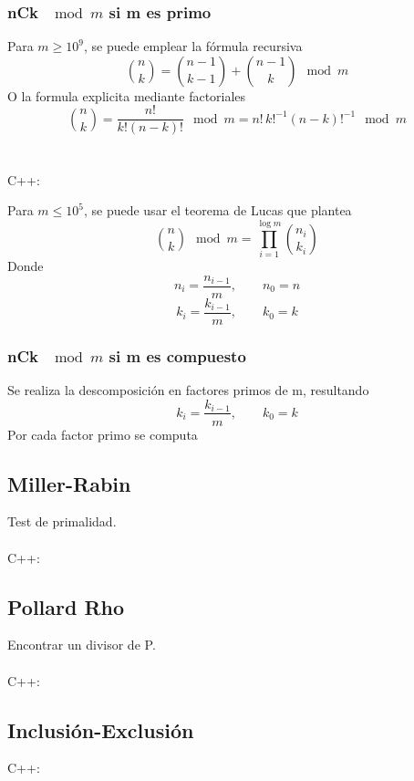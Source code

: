\documentclass{article}
\begin{document}
        \subsubsection{nCk $\mod{m}$ si m es primo}
            Para $m \geq 10^9$, se puede emplear la fórmula recursiva
            \[
                \binom{n}{k} = \binom{n - 1}{k - 1} + \binom{n - 1}{k} \mod{m}
            \]
            O la formula explicita mediante factoriales
            \[
                \binom{n}{k} = \frac{n!}{k!(n-k)!}  \mod m = n!\, k!^{-1}(n - k)!^{-1} \mod{m}
            \]
            \\ \\
            C++:
            
            
            Para $ m \leq 10^5$, se puede usar el teorema de Lucas que plantea
            \[
                \binom{n}{k} \mod{m} = \prod_{i = 1}^{\log{m}}\binom{n_i}{k_i}
            \]
            Donde
            \[
                n_i = \frac{n_{i - 1}}{m}, \qquad n_0 = n
            \]
            \[
                k_i = \frac{k_{i - 1}}{m}, \qquad k_0 = k
            \]
        \subsubsection{nCk $\mod{m}$ si m es compuesto}
            Se realiza la descomposición en factores primos de m, resultando
            \[
                k_i = \frac{k_{i - 1}}{m}, \qquad k_0 = k
            \]
            Por cada factor primo se computa 
    \subsection{Miller-Rabin}
        Test de primalidad.
        \\ \\
        C++:
        
    \subsection{Pollard Rho}
        Encontrar un divisor de P.
        \\ \\
        C++:
        
    \subsection{Inclusión-Exclusión}
        C++:
        
    \
\pagebreak
\end{document}
